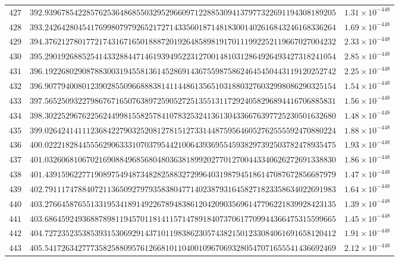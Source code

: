 \documentclass[12pt,reqno]{amsart}
\theoremstyle{remark}
\begin{document}
\begin{longtable}{clc}
$427$ & $392.9396785422857625364868550329529660971228853094137977322691194308189205$ & $1.31\times 10^{-448}$ \\
$428$ & $393.2426428045417699807979265217271433560187148183001402616843246168336264$ & $1.69\times 10^{-448}$ \\
$429$ & $394.3762127801772174316716501888720192648589819170111992252119667027004232$ & $2.33\times 10^{-448}$ \\
$430$ & $395.2901926885254143328844714619394952231270014810312864926493427318241054$ & $2.85\times 10^{-448}$ \\
$431$ & $396.1922680290878830031945581361452869143675598758624645450443119120252742$ & $2.25\times 10^{-448}$ \\
$432$ & $396.9077940080123902855096688838141144861356510318803276032998086290325154$ & $1.54\times 10^{-448}$ \\
$433$ & $397.5652509322798676716507638972590527251355131172924058296894416706885831$ & $1.56\times 10^{-448}$ \\
$434$ & $398.3022529676225624499815582578410783253241361304336676397725230501632680$ & $1.48\times 10^{-448}$ \\
$435$ & $399.0264241411123684227903252081278151273314487595646052762555592470880224$ & $1.88\times 10^{-448}$ \\
$436$ & $400.0222182844555629063331070379544210064393695545938297392503782478935475$ & $1.93\times 10^{-448}$ \\
$437$ & $401.0326068106702169088496856804803638189920277012700443340626272691338830$ & $1.86\times 10^{-448}$ \\
$438$ & $401.4391596227719089754948734828258832729964031987945186147087672856687979$ & $1.47\times 10^{-448}$ \\
$439$ & $402.7911174788407211365092797935838047714023879316458271823358634022691983$ & $1.64\times 10^{-448}$ \\
$440$ & $403.2766458765513319534189149226789483861204209035696147796221839928423135$ & $1.39\times 10^{-448}$ \\
$441$ & $403.6864592493688789811945701181411571478918407370617709944366475315599665$ & $1.45\times 10^{-448}$ \\
$442$ & $404.7272352353853931530692914371011983862305743821501233084061691658120412$ & $1.91\times 10^{-448}$ \\
$443$ & $405.5417263427773582588095761266810110400109670693280547071655541436692469$ & $2.12\times 10^{-448}$ \\

\end{longtable}
\end{document}
